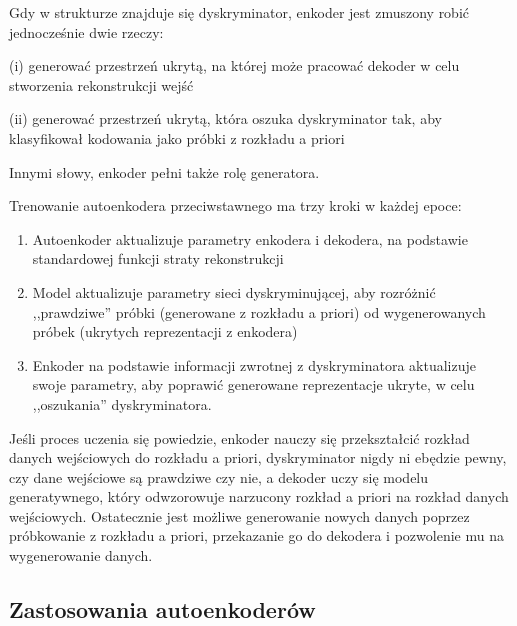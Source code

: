 \documentclass[12pt]{mwbk}
\theoremstyle{plain}
\theoremstyle{definition}
\theoremstyle{remark}
\begin{document}
\noindent Gdy w strukturze znajduje się dyskryminator, enkoder jest zmuszony robić jednocześnie dwie rzeczy:

\noindent (i) generować przestrzeń ukrytą, na której może pracować dekoder w celu stworzenia rekonstrukcji wejść

\noindent (ii) generować przestrzeń ukrytą, która oszuka dyskryminator tak, aby klasyfikował kodowania jako próbki z rozkładu a priori

\noindent Innymi słowy, enkoder pełni także rolę generatora.

Trenowanie autoenkodera przeciwstawnego ma trzy kroki w każdej epoce:
 
 \begin{enumerate}

\item Autoenkoder aktualizuje parametry enkodera i dekodera, na podstawie standardowej funkcji straty rekonstrukcji

\item Model aktualizuje parametry sieci dyskryminującej, aby rozróżnić ,,prawdziwe'' próbki (generowane z rozkładu a priori) od wygenerowanych próbek (ukrytych reprezentacji z enkodera)

\item Enkoder na podstawie informacji zwrotnej z dyskryminatora aktualizuje swoje parametry, aby poprawić generowane reprezentacje ukryte, w celu ,,oszukania'' dyskryminatora.

\end{enumerate}

Jeśli proces uczenia się powiedzie, enkoder nauczy się przekształcić rozkład danych wejściowych do rozkładu a priori,  dyskryminator nigdy ni ebędzie pewny, czy dane wejściowe są prawdziwe czy nie, a dekoder uczy się modelu generatywnego, który odwzorowuje narzucony rozkład a priori na rozkład danych wejściowych. Ostatecznie jest możliwe generowanie nowych danych poprzez próbkowanie z rozkładu a priori, przekazanie go do dekodera i pozwolenie mu na wygenerowanie danych.




\subsection{Zastosowania autoenkoderów}
\end{document}
